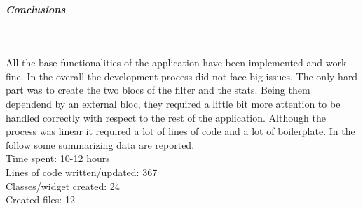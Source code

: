 \subparagraph{Conclusions}\mbox{}\\
\label{subpar:todo_app_bloc_core_state}

All the base functionalities of the application have been implemented and work fine. In the overall the development process did not face big issues. The only hard part was to create the two blocs of the filter and the stats. Being them dependend by an external bloc, they required a little bit more attention to be handled correctly with respect to the rest of the application. Although the process was linear it required a lot of lines of code and a lot of boilerplate. In the follow some summarizing data are reported.\\

Time spent: 10-12 hours\\
Lines of code written/updated: 367\\
Classes/widget created: 24\\
Created files: 12\\


